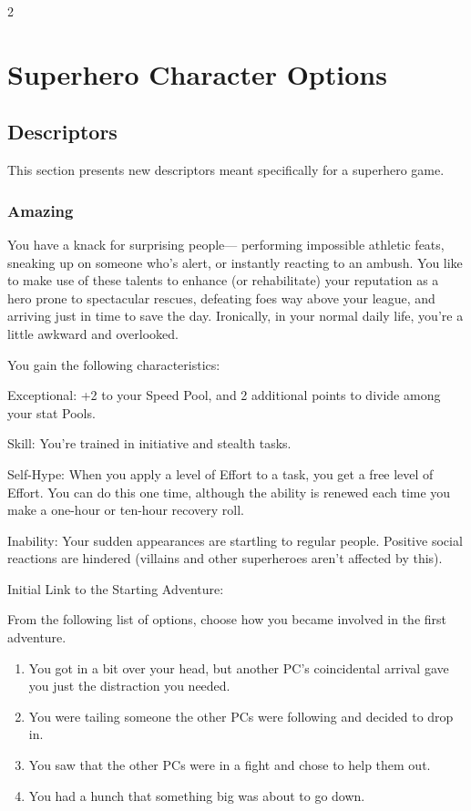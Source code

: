\begin{multicols}{2}

\chapter{Superhero Character Options}

\section{Descriptors}

This section presents new descriptors meant specifically for a superhero game.

\subsection{Amazing}

You have a knack for surprising people— performing impossible athletic feats, sneaking up on someone who’s alert, or instantly reacting to an ambush. You like to make use of these talents to enhance (or rehabilitate) your reputation as a hero prone to spectacular rescues, defeating foes way above your league, and arriving just in time to save the day. Ironically, in your normal daily life, you’re a little awkward and overlooked.

You gain the following characteristics:

Exceptional: +2 to your Speed Pool, and 2 additional points to divide among your stat Pools.

Skill: You’re trained in initiative and stealth tasks.

Self-Hype: When you apply a level of Effort to a task, you get a free level of Effort. You can do this one time, although the ability is renewed each time you make a one-hour or ten-hour recovery roll.

Inability: Your sudden appearances are startling to regular people. Positive social reactions are hindered (villains and other superheroes aren’t affected by this).

Initial Link to the Starting Adventure:

From the following list of options, choose how you became involved in the first adventure.

\begin{enumerate}
\item You got in a bit over your head, but another PC’s coincidental arrival gave you just the distraction you needed.
\item You were tailing someone the other PCs were following and decided to drop in.
\item You saw that the other PCs were in a fight and chose to help them out.
\item You had a hunch that something big was about to go down.
\end{enumerate}


\end{multicols}
